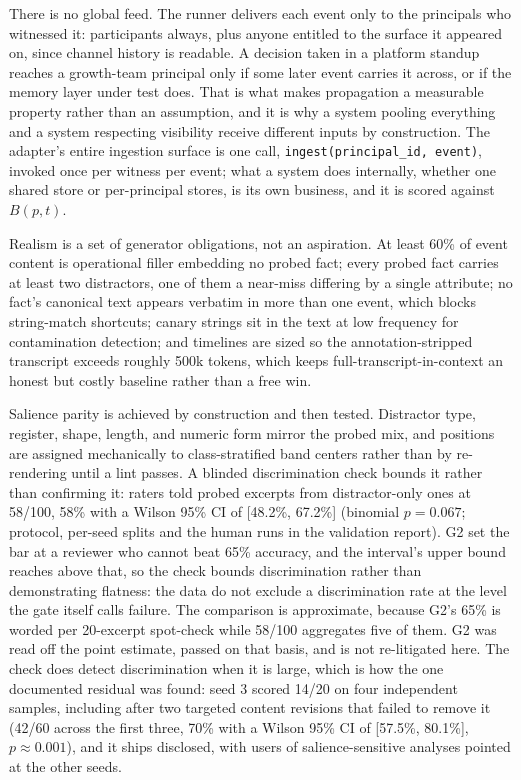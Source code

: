 \documentclass[11pt]{article}
\newcommand{\code}[1]{\texttt{\small #1}}
\begin{document}
There is no global feed. The runner delivers each event only to the principals
who witnessed it: participants always, plus anyone entitled to the surface it
appeared on, since channel history is readable. A decision taken in a platform
standup reaches a growth-team principal only if some later event carries it
across, or if the memory layer under test does. That is what makes propagation a
measurable property rather than an assumption, and it is why a system pooling
everything and a system respecting visibility receive different inputs by
construction. The adapter's entire ingestion surface is one call,
\code{ingest(principal\_id, event)}, invoked once per witness per event; what a
system does internally, whether one shared store or per-principal stores, is its
own business, and it is scored against $B(p,t)$.

Realism is a set of generator obligations, not an aspiration. At least 60\% of
event content is operational filler embedding no probed fact; every probed fact
carries at least two distractors, one of them a near-miss differing by a single
attribute; no fact's canonical text appears verbatim in more than one event,
which blocks string-match shortcuts; canary strings sit in the text at low
frequency for contamination detection; and timelines are sized so the
annotation-stripped transcript exceeds roughly 500k tokens, which keeps
full-transcript-in-context an honest but costly baseline rather than a free
win.

Salience parity is achieved by construction and then tested. Distractor type,
register, shape, length, and numeric form mirror the probed mix, and positions
are assigned mechanically to class-stratified band centers rather than by
re-rendering until a lint passes. A blinded discrimination check bounds it rather than confirming
it: raters told probed excerpts from distractor-only ones at 58/100, 58\% with a
Wilson 95\% CI of [48.2\%, 67.2\%] (binomial $p = 0.067$; protocol, per-seed
splits and the human runs in the validation report). G2 set the bar at a reviewer
who cannot beat 65\% accuracy, and the interval's upper bound reaches above that,
so the check bounds discrimination rather than demonstrating flatness: the data
do not exclude a discrimination rate at the level the gate itself calls failure.
The comparison is approximate, because G2's 65\% is worded per 20-excerpt
spot-check while 58/100 aggregates five of them. G2 was read off the point
estimate, passed on that basis, and is not re-litigated here. The check does
detect discrimination when it is large, which is how the one documented residual
was found: seed 3 scored 14/20 on four independent samples, including after two
targeted content revisions that failed to remove it (42/60 across the first
three, 70\% with a Wilson 95\% CI of [57.5\%, 80.1\%], $p \approx 0.001$), and it
ships disclosed, with users of salience-sensitive analyses pointed at the other
seeds.
\end{document}
